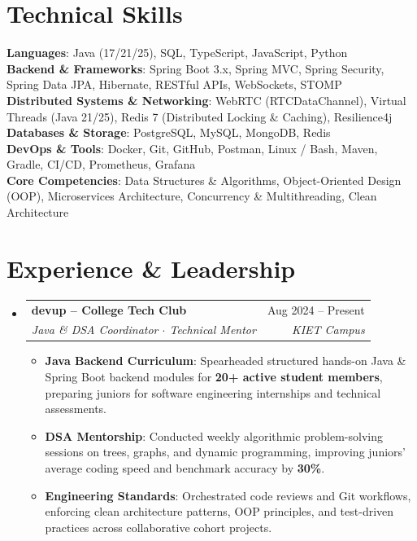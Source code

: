 \documentclass[letterpaper,10pt]{article}
\makeatletter
\newcommand{\resumeItem}[2]{
  \item\small{
    \textbf{#1}{: #2 \vspace{-1.5pt}}
  }
}
\newcommand{\resumeSubheading}[4]{
  \vspace{-1.5pt}\item
    \begin{tabular*}{0.97\textwidth}[t]{l@{\extracolsep{\fill}}r}
      \textbf{#1} & #2 \\
      \textit{\small#3} & \textit{\small #4} \\
    \end{tabular*}\vspace{-5pt}
}
\newcommand{\resumeSubHeadingListStart}{\begin{itemize}[leftmargin=*,label={}]}
\newcommand{\resumeSubHeadingListEnd}{\end{itemize}}
\newcommand{\resumeItemListStart}{\begin{itemize}[leftmargin=12pt]}
\newcommand{\resumeItemListEnd}{\end{itemize}\vspace{-4pt}}
\makeatother
\begin{document}
\section{Technical Skills}
 \begin{itemize}[leftmargin=*,label={}]
    \small{\item{
     \textbf{Languages}{: Java (17/21/25), SQL, TypeScript, JavaScript, Python} \\
     \textbf{Backend \& Frameworks}{: Spring Boot 3.x, Spring MVC, Spring Security, Spring Data JPA, Hibernate, RESTful APIs, WebSockets, STOMP} \\
     \textbf{Distributed Systems \& Networking}{: WebRTC (RTCDataChannel), Virtual Threads (Java 21/25), Redis 7 (Distributed Locking \& Caching), Resilience4j} \\
     \textbf{Databases \& Storage}{: PostgreSQL, MySQL, MongoDB, Redis} \\
     \textbf{DevOps \& Tools}{: Docker, Git, GitHub, Postman, Linux / Bash, Maven, Gradle, CI/CD, Prometheus, Grafana} \\
     \textbf{Core Competencies}{: Data Structures \& Algorithms, Object-Oriented Design (OOP), Microservices Architecture, Concurrency \& Multithreading, Clean Architecture}
    }}
 \end{itemize}

\section{Experience \& Leadership}
  \resumeSubHeadingListStart
    \resumeSubheading
      {devup -- College Tech Club}{Aug 2024 -- Present}
      {Java \& DSA Coordinator $\cdot$ Technical Mentor}{KIET Campus}
      \resumeItemListStart
        \resumeItem{Java Backend Curriculum}{Spearheaded structured hands-on Java \& Spring Boot backend modules for \textbf{20+ active student members}, preparing juniors for software engineering internships and technical assessments.}
        \resumeItem{DSA Mentorship}{Conducted weekly algorithmic problem-solving sessions on trees, graphs, and dynamic programming, improving juniors' average coding speed and benchmark accuracy by \textbf{30\%}.}
        \resumeItem{Engineering Standards}{Orchestrated code reviews and Git workflows, enforcing clean architecture patterns, OOP principles, and test-driven practices across collaborative cohort projects.}
      \resumeItemListEnd
  \resumeSubHeadingListEnd

\end{document}
